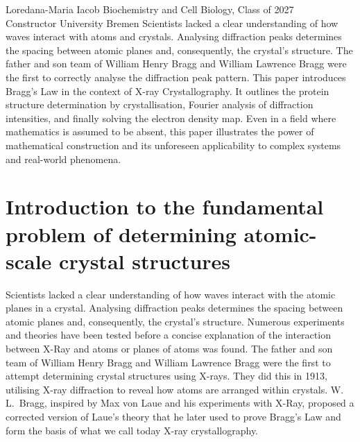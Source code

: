 \label{art:bragg}

  {Loredana-Maria Iacob}
  {Biochemistry and Cell Biology, Class of 2027\\Constructor University Bremen}
  {Scientists lacked a clear understanding of how waves interact with atoms
   and crystals.  Analysing diffraction peaks determines the spacing between
   atomic planes and, consequently, the crystal's structure.  The father and
   son team of William Henry Bragg and William Lawrence Bragg were the first
   to correctly analyse the diffraction peak pattern.
   This paper introduces Bragg's Law in the context of X-ray Crystallography.
   It outlines the protein structure determination by crystallisation, Fourier
   analysis of diffraction intensities, and finally solving the electron density
   map.  Even in a field where mathematics is assumed to be absent, this paper
   illustrates the power of mathematical construction and its unforeseen
   applicability to complex systems and real-world phenomena.}


\section{Introduction to the fundamental problem of determining atomic-scale
crystal structures}

Scientists lacked a clear understanding of how waves interact with the atomic
planes in a crystal.  Analysing diffraction peaks determines the spacing
between atomic planes and, consequently, the crystal's structure.  Numerous
experiments and theories have been tested before a concise explanation of the
interaction between X-Ray and atoms or planes of atoms was found.
The father and son team of William Henry Bragg and William Lawrence Bragg
were the first to attempt determining crystal structures using X-rays.  They
did this in 1913, utilising X-ray diffraction to reveal how atoms are arranged
within crystals.  W.\,L.\ Bragg, inspired by Max von Laue and his experiments
with X-Ray, proposed a corrected version of Laue's theory that he later used
to prove Bragg's Law and form the basis of what we call today X-ray
crystallography.

